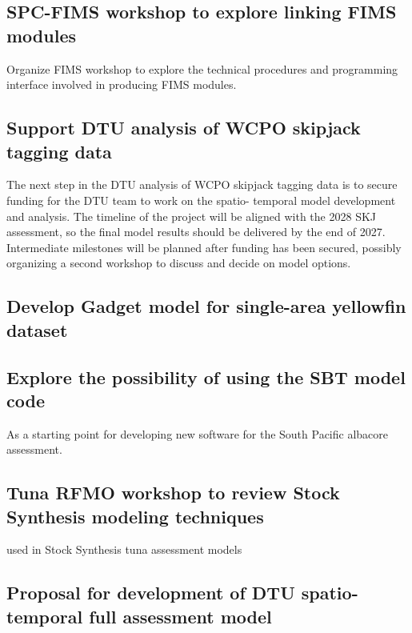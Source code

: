 \documentclass{SCreport}
\begin{document}
\subsection{SPC-FIMS workshop to explore linking FIMS modules}
\label{sec:fims-workshop}

Organize FIMS workshop to explore the technical procedures and programming
interface involved in producing FIMS modules.

\subsection{Support DTU analysis of WCPO skipjack tagging data}
\label{sec:dtu-support-tagging}

The next step in the DTU analysis of WCPO skipjack tagging data is to secure
funding for the DTU team to work on the spatio- temporal model development and
analysis. The timeline of the project will be aligned with the 2028 SKJ
assessment, so the final model results should be delivered by the end of 2027.
Intermediate milestones will be planned after funding has been secured, possibly
organizing a second workshop to discuss and decide on model options.

\subsection{Develop Gadget model for single-area yellowfin dataset}
\label{sec:yft-gadget}

\subsection{Explore the possibility of using the SBT model code}

As a starting point for developing new software for the South Pacific albacore
assessment.

\subsection{Tuna RFMO workshop to review Stock Synthesis modeling techniques}
\label{sec:ss-workshop}

used in Stock Synthesis tuna assessment models

\subsection{Proposal for development of DTU spatio-temporal full assessment
  model}
\label{sec:dtu-support-assessment}
\end{document}
